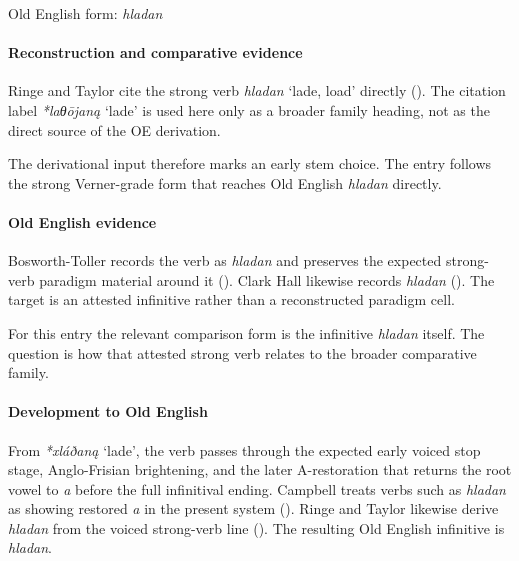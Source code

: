 \documentclass[
  british,
  a4paper,
]{article}
\providecommand{\Recon}[1]{\emph{*#1}}
\begin{document}
Old English form: \emph{hladan}

\paragraph{Reconstruction and comparative
evidence}\label{reconstruction-and-comparative-evidence-92}

Ringe and Taylor cite the strong verb {\emph{hladan}} `lade, load'
directly ().
The citation label \Recon{laθōjaną} `lade' is used here only as a
broader family heading, not as the direct source of the OE derivation.

The derivational input therefore marks an early stem choice. The entry
follows the strong Verner-grade form that reaches Old English
\emph{hladan} directly.

\paragraph{Old English evidence}\label{old-english-evidence-92}

Bosworth-Toller records the verb as \emph{hladan} and preserves the
expected strong-verb paradigm material around it
().
Clark Hall likewise records \emph{hladan}
(). The target is an
attested infinitive rather than a reconstructed paradigm cell.

For this entry the relevant comparison form is the infinitive
\emph{hladan} itself. The question is how that attested strong verb
relates to the broader comparative family.

\paragraph{Development to Old
English}\label{development-to-old-english-92}

From \Recon{xláðaną} `lade', the verb passes through the expected early
voiced stop stage, Anglo-Frisian brightening, and the later
A-restoration that returns the root vowel to \emph{a} before the full
infinitival ending. Campbell treats verbs such as \emph{hladan} as
showing restored \emph{a} in the present system
(). Ringe and
Taylor likewise derive \emph{hladan} from the voiced strong-verb line
(). The
resulting Old English infinitive is \emph{hladan}.
\end{document}
